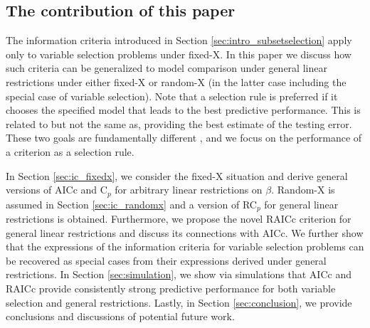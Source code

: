 \subsection{The contribution of this paper}
The information criteria introduced in Section \ref{sec:intro_subsetselection} apply only to variable selection problems under fixed-X. In this paper we discuss how such criteria can be generalized to model comparison under general linear restrictions under either fixed-X or random-X (in the latter case including the special case of variable selection). Note that a selection rule is preferred if it chooses the specified model that leads to the best predictive performance. This is related to but not the same as, providing the best estimate of the testing error. These two goals are fundamentally different \citep[see, e.g.,][Section 7]{hastie2009elements}, and we focus on the performance of a criterion as a selection rule.

In Section \ref{sec:ic_fixedx}, we consider the fixed-X situation and derive general versions of AICc and C$_p$ for arbitrary linear restrictions on $\beta$. Random-X is assumed in Section \ref{sec:ic_randomx} and a version of RC$_p$ for general linear restrictions is obtained. Furthermore, we propose the novel RAICc criterion for general linear restrictions and discuss its connections with AICc. We further show that the expressions of the information criteria for variable selection problems can be recovered as special cases from their expressions derived under general restrictions. In Section \ref{sec:simulation}, we show via simulations that AICc and RAICc provide consistently strong predictive performance for both variable selection and general restrictions. Lastly, in Section \ref{sec:conclusion}, we provide conclusions and discussions of potential future work.

